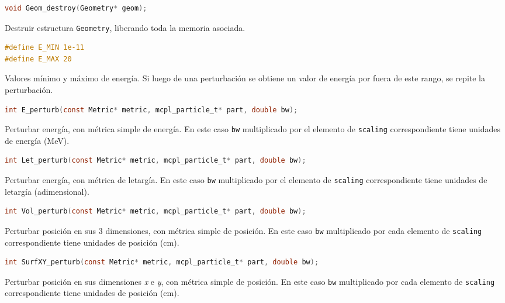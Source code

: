 \begin{footnotesize}
\begin{lstlisting}[language=C]
void Geom_destroy(Geometry* geom);
\end{lstlisting}
\begin{addmargin}[0.5cm]{0cm}
Destruir estructura \verb|Geometry|, liberando toda la memoria asociada.
\end{addmargin}

\begin{lstlisting}[language=C]
#define E_MIN 1e-11
#define E_MAX 20
\end{lstlisting}
\begin{addmargin}[0.5cm]{0cm}
Valores mínimo y máximo de energía. Si luego de una perturbación se obtiene un valor de energía por fuera de este rango, se repite la perturbación.
\end{addmargin}

\begin{lstlisting}[language=C]
int E_perturb(const Metric* metric, mcpl_particle_t* part, double bw);
\end{lstlisting}
\begin{addmargin}[0.5cm]{0cm}
Perturbar energía, con métrica simple de energía. En este caso \verb|bw| multiplicado por el elemento de \verb|scaling| correspondiente tiene unidades de energía (MeV).
\end{addmargin}

\begin{lstlisting}[language=C]
int Let_perturb(const Metric* metric, mcpl_particle_t* part, double bw);
\end{lstlisting}
\begin{addmargin}[0.5cm]{0cm}
Perturbar energía, con métrica de letargía. En este caso \verb|bw| multiplicado por el elemento de \verb|scaling| correspondiente tiene unidades de letargía (adimensional).
\end{addmargin}

\begin{lstlisting}[language=C]
int Vol_perturb(const Metric* metric, mcpl_particle_t* part, double bw);
\end{lstlisting}
\begin{addmargin}[0.5cm]{0cm}
Perturbar posición en sus 3 dimensiones, con métrica simple de posición. En este caso \verb|bw| multiplicado por cada elemento de \verb|scaling| correspondiente tiene unidades de posición (cm).
\end{addmargin}

\begin{lstlisting}[language=C]
int SurfXY_perturb(const Metric* metric, mcpl_particle_t* part, double bw);
\end{lstlisting}
\begin{addmargin}[0.5cm]{0cm}
Perturbar posición en sus dimensiones \emph{x} e \emph{y}, con métrica simple de posición. En este caso \verb|bw| multiplicado por cada elemento de \verb|scaling| correspondiente tiene unidades de posición (cm).
\end{addmargin}


\end{footnotesize}
